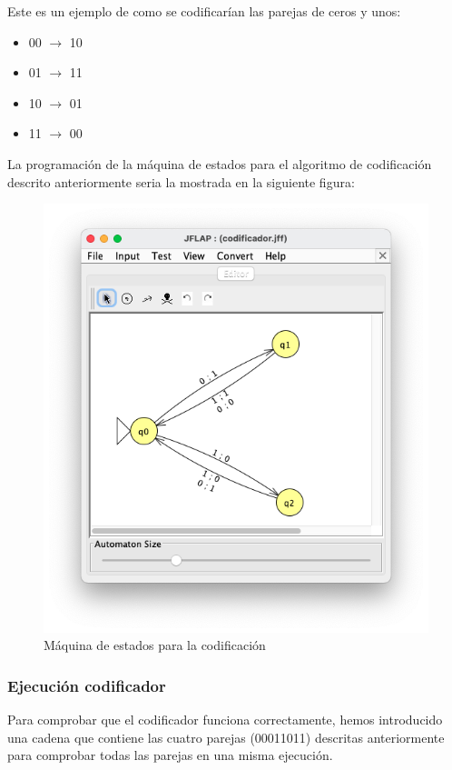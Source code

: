 Este es un ejemplo de como se codificarían las parejas de ceros y unos:
\begin{itemize}
	\item 00 $\rightarrow$ 10
	\item 01 $\rightarrow$ 11
	\item 10 $\rightarrow$ 01
	\item 11 $\rightarrow$ 00
\end{itemize}

La programación de la máquina de estados para el algoritmo de codificación descrito anteriormente seria la mostrada en la siguiente figura:

\begin{figure}[H] 
	\centering
	\includegraphics[scale=0.6]{../practica_3/images/codificador.png} 
	\caption{Máquina de estados para la codificación} 
    \label{fig:codificador}
\end{figure}

\subsubsection{Ejecución codificador}
Para comprobar que el codificador funciona correctamente, hemos introducido una cadena que contiene las cuatro parejas (00011011) descritas anteriormente para comprobar todas las parejas en una misma ejecución.

